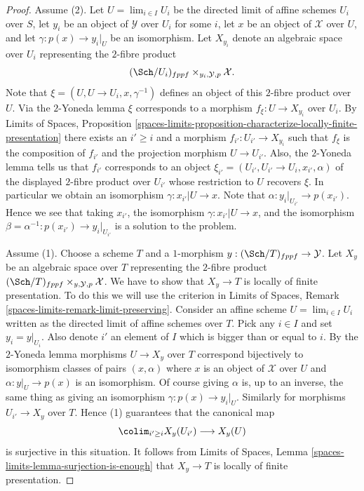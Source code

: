 \begin{proof}
Assume (2). Let $U = \lim_{i \in I} U_i$ be the directed limit
of affine schemes $U_i$ over $S$, let $y_i$ be an object of $\mathcal{Y}$
over $U_i$ for some $i$, let $x$ be an object of $\mathcal{X}$ over $U$,
and let $\gamma : p(x) \to y_i|_U$ be an isomorphism. Let
$X_{y_i}$ denote an algebraic space over $U_i$ representing the $2$-fibre
product
$$
(\Sch/U_i)_{fppf} \times_{y_i, \mathcal{Y}, p} \mathcal{X}.
$$
Note that $\xi = (U, U \to U_i, x, \gamma^{-1})$ defines an object of
this $2$-fibre product over $U$. Via the $2$-Yoneda lemma $\xi$ corresponds
to a morphism $f_\xi : U \to X_{y_i}$ over $U_i$. By
Limits of Spaces, Proposition
\ref{spaces-limits-proposition-characterize-locally-finite-presentation}
there exists an $i' \geq i$ and a morphism $f_{i'} : U_{i'} \to X_{y_i}$
such that $f_\xi$ is the composition of $f_{i'}$ and the projection
morphism $U \to U_{i'}$. Also, the $2$-Yoneda lemma tells us that
$f_{i'}$ corresponds to an object
$\xi_{i'} = (U_{i'}, U_{i'} \to U_i, x_{i'}, \alpha)$ of
the displayed $2$-fibre product over $U_{i'}$ whose restriction to
$U$ recovers $\xi$. In particular we obtain an isomorphism
$\gamma : x_{i'}|U \to x$. Note that $\alpha : y_i|_{U_{i'}} \to p(x_{i'})$.
Hence we see that taking $x_{i'}$, the isomorphism
$\gamma : x_{i'}|U \to x$, and the isomorphism
$\beta = \alpha^{-1} : p(x_{i'}) \to y_i|_{U_{i'}}$
is a solution to the problem.

\medskip\noindent
Assume (1). Choose a scheme $T$ and a $1$-morphism
$y : (\Sch/T)_{fppf} \to \mathcal{Y}$. Let
$X_y$ be an algebraic space over $T$ representing the $2$-fibre product
$(\Sch/T)_{fppf} \times_{y, \mathcal{Y}, p} \mathcal{X}$.
We have to show that $X_y \to T$ is locally of finite presentation.
To do this we will use the criterion in
Limits of Spaces, Remark \ref{spaces-limits-remark-limit-preserving}.
Consider an affine scheme $U = \lim_{i \in I} U_i$ written as the
directed limit of affine schemes over $T$.
Pick any $i \in I$ and set $y_i = y|_{U_i}$. Also denote $i'$ an element
of $I$ which is bigger than or equal to $i$. By the $2$-Yoneda lemma
morphisms $U \to X_y$ over $T$ correspond bijectively
to isomorphism classes of pairs $(x, \alpha)$ where $x$ is an object
of $\mathcal{X}$ over $U$ and $\alpha : y|_U \to p(x)$ is an isomorphism.
Of course giving $\alpha$ is, up to an inverse, the same thing as giving
an isomorphism $\gamma : p(x) \to y_i|_U$.
Similarly for morphisms $U_{i'} \to X_y$ over $T$. Hence (1) guarantees
that the canonical map
$$
\colim_{i' \geq i} X_y(U_{i'}) \longrightarrow X_y(U)
$$
is surjective in this situation. It follows from
Limits of Spaces, Lemma \ref{spaces-limits-lemma-surjection-is-enough}
that $X_y \to T$ is locally of finite presentation.
\end{proof}

